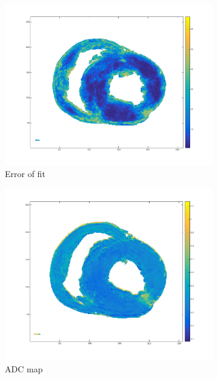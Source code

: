 \begin{figure}
    \centering
    \begin{subfigure}{.31\textwidth}
        \includegraphics[width=\textwidth]{figures/pig2_err_31}
        \caption{Error of fit}
        \label{fig:pig2_err}
    \end{subfigure}
    \begin{subfigure}{.31\textwidth}
        \includegraphics[width=\textwidth]{figures/pig2_adc_31}
        \caption{ADC map}
        \label{fig:pig2_adc}
    \end{subfigure}
    \begin{subfigure}{.31\textwidth}

\end{subfigure}
\end{figure}
